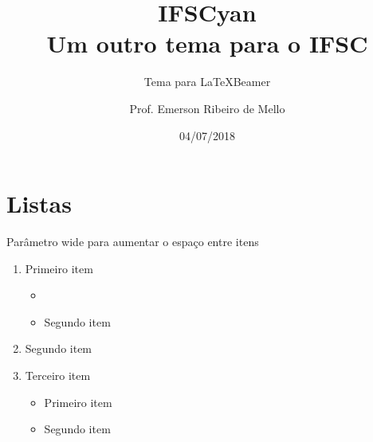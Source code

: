 \documentclass{beamer}
\title{IFSCyan \\ Um outro tema para o IFSC}
\subtitle{Tema para \LaTeX Beamer}
\author{Prof. Emerson Ribeiro de Mello}
\institute{
\href{mello@ifsc.edu.br}{mello@ifsc.edu.br}
}
\date{04/07/2018}
\newcommand{\MYhref}[3][blue]{\href{#2}{\color{#1}{<#3>}}}%
\begin{document}
\begin{frame}[t]
	\maketitle
\end{frame}

\section{Listas}

\begin{frame}[wide]{Parâmetro wide para aumentar o espaço entre itens}
	\begin{enumerate}
		\item Primeiro item
		\begin{itemize}
			\item \MYhref{http://docente.ifsc.edu.br/mello}{Aqui está um exemplo de link para site}
			\item Segundo item
		\end{itemize}
		\item Segundo item
		\item Terceiro item 
		\begin{itemize}
			\item Primeiro item
			\item Segundo item
		\end{itemize}
	\end{enumerate}
\end{frame}
\end{document}
